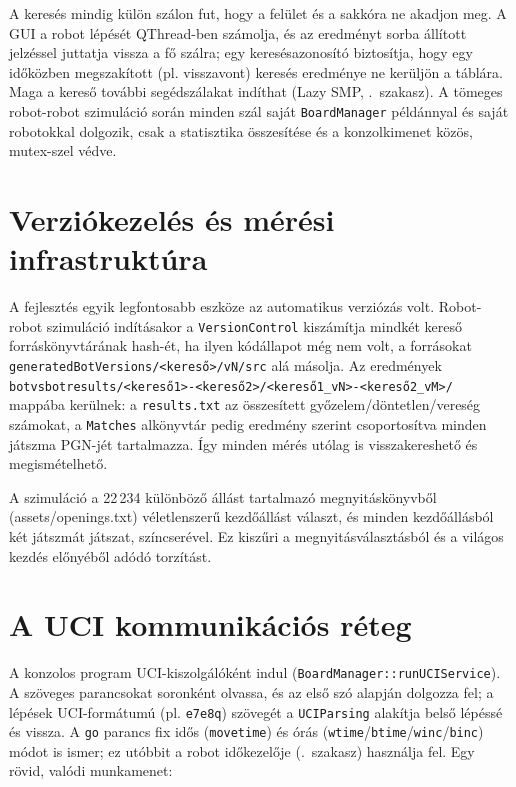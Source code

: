 A keresés mindig külön szálon fut, hogy a felület és a sakkóra ne akadjon meg. A GUI a robot lépését QThread-ben számolja, és az eredményt sorba állított jelzéssel juttatja vissza a fő szálra; egy keresésazonosító biztosítja, hogy egy időközben megszakított (pl. visszavont) keresés eredménye ne kerüljön a táblára. Maga a kereső további segédszálakat indíthat (Lazy SMP, .~szakasz). A tömeges robot-robot szimuláció során minden szál saját \texttt{BoardManager} példánnyal és saját robotokkal dolgozik, csak a statisztika összesítése és a konzolkimenet közös, mutex-szel védve.

\section{Verziókezelés és mérési infrastruktúra}\label{sec:versioning}

A fejlesztés egyik legfontosabb eszköze az automatikus verziózás volt. Robot-robot szimuláció indításakor a \texttt{VersionControl} kiszámítja mindkét kereső forráskönyvtárának hash-ét, ha ilyen kódállapot még nem volt, a forrásokat \texttt{generatedBotVersions/<kereső>/vN/src} alá másolja. Az eredmények \texttt{botvsbotresults/<kereső1>-<kereső2>/<kereső1\_vN>-<kereső2\_vM>/} mappába kerülnek: a \texttt{results.txt} az összesített győzelem/döntetlen/vereség számokat, a \texttt{Matches} alkönyvtár pedig eredmény szerint csoportosítva minden játszma PGN-jét tartalmazza. Így minden mérés utólag is visszakereshető és megismételhető.

A szimuláció a 22\,234 különböző állást tartalmazó megnyitáskönyvből (assets/openings.txt) véletlenszerű kezdőállást választ, és minden kezdőállásból két játszmát játszat, színcserével. Ez kiszűri a megnyitásválasztásból és a világos kezdés előnyéből adódó torzítást.

\section{A UCI kommunikációs réteg}\label{sec:uci}

A konzolos program UCI-kiszolgálóként indul (\texttt{BoardManager::runUCIService}). A szöveges parancsokat soronként olvassa, és az első szó alapján dolgozza fel; a lépések UCI-formátumú (pl. \texttt{e7e8q}) szövegét a \texttt{UCIParsing} alakítja belső lépéssé és vissza. A \texttt{go} parancs fix idős (\texttt{movetime}) és órás (\texttt{wtime}/\texttt{btime}/\texttt{winc}/\texttt{binc}) módot is ismer; ez utóbbit a robot időkezelője (.~szakasz) használja fel. Egy rövid, valódi munkamenet:

